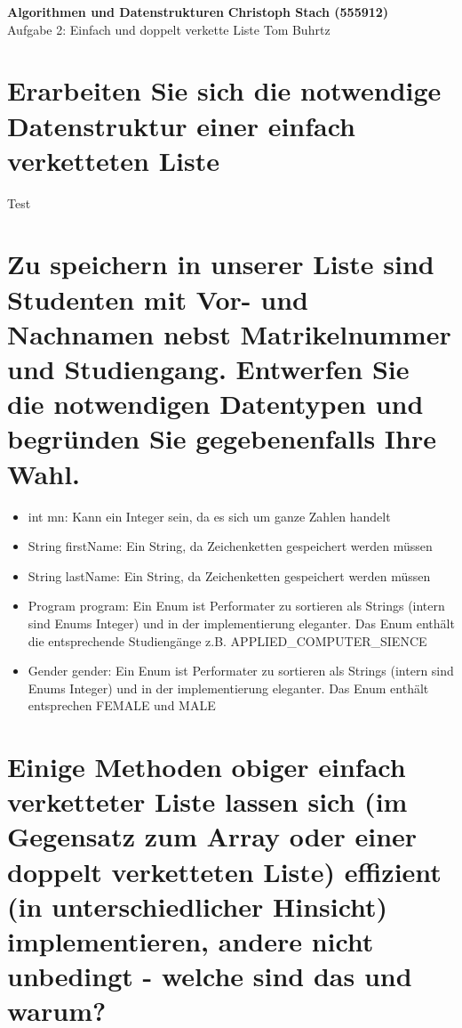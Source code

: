 \documentclass[a4paper, 11pt]{article}
\begin{document}
\noindent
\large\textbf{Algorithmen und Datenstrukturen} \hfill \textbf{Christoph Stach (555912)} \\
\normalsize Aufgabe 2: Einfach und doppelt verkette Liste \hfill Tom Buhrtz \\



\section*{Erarbeiten Sie sich die notwendige Datenstruktur einer einfach verketteten Liste}

Test

\section*{Zu speichern in unserer Liste sind Studenten mit Vor- und Nachnamen nebst Matrikelnummer und Studiengang.
          Entwerfen Sie die notwendigen Datentypen und begründen Sie gegebenenfalls Ihre Wahl.}

\begin{minipage}[t]{0.7\textwidth}
    \begin{itemize}
        \item int mn: Kann ein Integer sein, da es sich um ganze Zahlen handelt
        \item String firstName: Ein String, da Zeichenketten gespeichert werden müssen
        \item String lastName: Ein String, da Zeichenketten gespeichert werden müssen
        \item Program program: Ein Enum ist Performater zu sortieren als Strings (intern sind Enums Integer) und in der implementierung eleganter.
    Das Enum enthält die entsprechende Studiengänge z.B. APPLIED\_COMPUTER\_SIENCE
        \item Gender gender: Ein Enum ist Performater zu sortieren als Strings (intern sind Enums Integer) und in der implementierung eleganter.
    Das Enum enthält entsprechen FEMALE und MALE
    \end{itemize}
\end{minipage}
\begin{minipage}[t]{0.4\textwidth}

\end{minipage}

\section*{Einige Methoden obiger einfach verketteter Liste lassen sich (im Gegensatz zum
          Array oder einer doppelt verketteten Liste) effizient (in unterschiedlicher Hinsicht)
          implementieren, andere nicht unbedingt - welche sind das und warum?}
\end{document}

